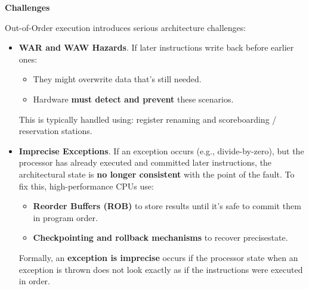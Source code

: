 \highspace
\begin{flushleft}
    \textcolor{Red2}{ \textbf{Challenges}}
\end{flushleft}
Out-of-Order execution introduces serious architecture challenges:
\begin{itemize}
    \item \textcolor{Red2}{\textbf{WAR and WAW Hazards}}. If later instructions write back before earlier ones:
    \begin{itemize}
        \item[\textcolor{Red2}{\faIcon{times}}] They might overwrite data that's still needed.
        \item[\textcolor{Green3}{\faIcon{check}}] Hardware \textbf{must detect and prevent} these scenarios.
    \end{itemize}
    This is typically handled using: register renaming and scoreboarding / reservation stations.

    
    \item \textcolor{Red2}{\textbf{Imprecise Exceptions}}. If an exception occurs (e.g., divide-by-zero), but the processor has already executed and committed later instructions, the architectural state is \textbf{no longer consistent} with the point of the fault. To fix this, high-performance CPUs use:
    \begin{itemize}[label=\textcolor{Green3}{}]
        \item \textbf{Reorder Buffers (ROB)} to store results until it's safe to commit them in program order.
        \item \textbf{Checkpointing and rollback mechanisms} to recover precise\break state.
    \end{itemize}
    Formally, an \textbf{exception is imprecise} occurs if the processor state when an exception is thrown does not look exactly as if the instructions were executed in order.
\end{itemize}

